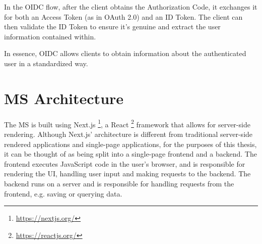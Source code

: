 In the OIDC flow, after the client obtains the Authorization Code,
it exchanges it for both an Access Token (as in OAuth 2.0) and an ID Token.
The client can then validate the ID Token to ensure it's genuine and extract the user information contained within.


%


In essence, OIDC allows clients to obtain information about the authenticated user in a standardized way.


\section {MS Architecture}
\label{cha:ms-architecture}

The MS is built using Next.js \footnote{\url{https://nextjs.org/}}, a React \footnote{\url{https://reactjs.org/}}
framework that allows for server-side rendering.
Although Next.js' architecture is different from traditional server-side rendered
applications and single-page applications,
for the purposes of this thesis,
it can be thought of as being split into a single-page frontend and a backend.
The frontend executes JavaScript code in the user's browser, and is
responsible for rendering the UI, handling user input and making requests to the backend.
The backend runs on a server and is responsible for handling requests from the frontend,
e.g. saving or querying data.

